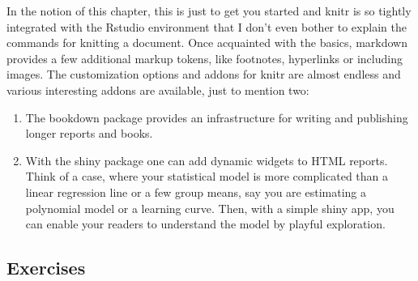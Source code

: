 \documentclass[]{svmono}
\providecommand{\tightlist}{%
  \setlength{\itemsep}{0pt}\setlength{\parskip}{0pt}}
\theoremstyle{definition}
\theoremstyle{definition}
\theoremstyle{definition}
\theoremstyle{remark}
\begin{document}
In the notion of this chapter, this is just to get you started and knitr
is so tightly integrated with the Rstudio environment that I don't even
bother to explain the commands for knitting a document. Once acquainted
with the basics, markdown provides a few additional markup tokens, like
footnotes, hyperlinks or including images. The customization options and
addons for knitr are almost endless and various interesting addons are
available, just to mention two:

\begin{enumerate}
\def\labelenumi{\arabic{enumi}.}
\tightlist
\item
  The bookdown package provides an infrastructure for writing and
  publishing longer reports and books.
\item
  With the shiny package one can add dynamic widgets to HTML reports.
  Think of a case, where your statistical model is more complicated than
  a linear regression line or a few group means, say you are estimating
  a polynomial model or a learning curve. Then, with a simple shiny app,
  you can enable your readers to understand the model by playful
  exploration.
\end{enumerate}

\subsection{Exercises}\label{exercises-1}
\end{document}
